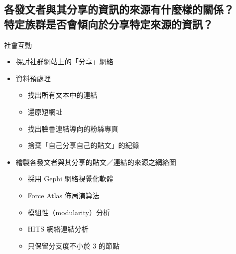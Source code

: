 \documentclass{beamer}
\begin{document}
\begin{CJK}{UTF8}{bkai}
\section{
各發文者與其分享的資訊的來源有什麼樣的關係？\texorpdfstring{\protect\\}{}
\hspace{.35em}特定族群是否會傾向於分享特定來源的資訊？
}

\begin{frame}{社會互動}
\begin{itemize}
\item 探討社群網站上的「分享」網絡
\item 資料預處理
  \begin{itemize}
  \item 找出所有文本中的連結
  \item 還原短網址
  \item 找出臉書連結導向的粉絲專頁
  \item 捨棄「自己分享自己的貼文」的紀錄
  \end{itemize}
\item 繪製各發文者與其分享的貼文／連結的來源之網絡圖
  \begin{itemize}
  \item 採用 Gephi 網絡視覺化軟體
  \item Force Atlas 佈局演算法
  \item 模組性（modularity）分析
  \item HITS 網絡連結分析
  \item 只保留分支度不小於 3 的節點
  \end{itemize}
\end{itemize}
\end{frame}

\end{CJK}
\end{document}
